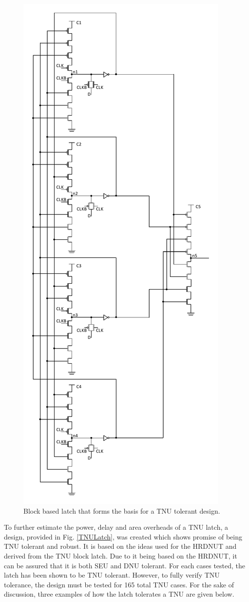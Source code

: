 \begin{figure}[!htbp]
	\centering
	\includegraphics[width=0.50\linewidth]{Figures/TNUBlatch}
	\caption{Block based latch that forms the basis for a TNU tolerant design.}
	\label{TNUB}
\end{figure}

To further estimate the power, delay and area overheads of a TNU latch, a design, provided in Fig. \ref{TNULatch}, was created which shows promise of being TNU tolerant and robust. It is based on the ideas used for the HRDNUT and derived from the TNU block latch. Due to it being based on the HRDNUT, it can be assured that it is both SEU and DNU tolerant. For each cases tested, the latch has been shown to be TNU tolerant. However, to fully verify TNU tolerance, the design must be tested for 165 total TNU cases. For the sake of discussion, three examples of how the latch tolerates a TNU are given below.  

